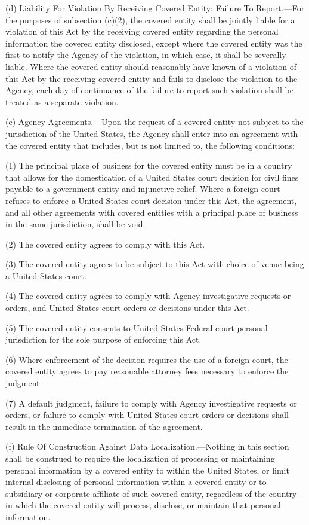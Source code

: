 (d) Liability For Violation By Receiving Covered Entity; Failure To Report.—For the purposes of subsection (c)(2), the covered entity shall be jointly liable for a violation of this Act by the receiving covered entity regarding the personal information the covered entity disclosed, except where the covered entity was the first to notify the Agency of the violation, in which case, it shall be severally liable. Where the covered entity should reasonably have known of a violation of this Act by the receiving covered entity and fails to disclose the violation to the Agency, each day of continuance of the failure to report such violation shall be treated as a separate violation.

(e) Agency Agreements.—Upon the request of a covered entity not subject to the jurisdiction of the United States, the Agency shall enter into an agreement with the covered entity that includes, but is not limited to, the following conditions:

(1) The principal place of business for the covered entity must be in a country that allows for the domestication of a United States court decision for civil fines payable to a government entity and injunctive relief. Where a foreign court refuses to enforce a United States court decision under this Act, the agreement, and all other agreements with covered entities with a principal place of business in the same jurisdiction, shall be void.

(2) The covered entity agrees to comply with this Act.

(3) The covered entity agrees to be subject to this Act with choice of venue being a United States court.

(4) The covered entity agrees to comply with Agency investigative requests or orders, and United States court orders or decisions under this Act.

(5) The covered entity consents to United States Federal court personal jurisdiction for the sole purpose of enforcing this Act.

(6) Where enforcement of the decision requires the use of a foreign court, the covered entity agrees to pay reasonable attorney fees necessary to enforce the judgment.

(7) A default judgment, failure to comply with Agency investigative requests or orders, or failure to comply with United States court orders or decisions shall result in the immediate termination of the agreement.

(f) Rule Of Construction Against Data Localization.—Nothing in this section shall be construed to require the localization of processing or maintaining personal information by a covered entity to within the United States, or limit internal disclosing of personal information within a covered entity or to subsidiary or corporate affiliate of such covered entity, regardless of the country in which the covered entity will process, disclose, or maintain that personal information.


